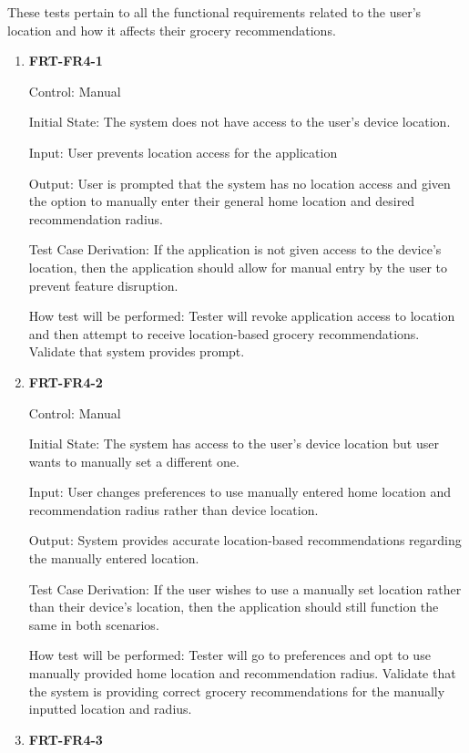 \documentclass[12pt, titlepage]{article}
\begin{document}
These tests pertain to all the functional requirements related to the user's location and how it affects their grocery recommendations.

\begin{enumerate}

\item{\textbf{FRT-FR4-1}}

Control: Manual
          
Initial State: The system does not have access to the user's device location.

Input: User prevents location access for the application
          
Output: User is prompted that the system has no location access and given the option to manually enter their general home location and desired recommendation radius.

Test Case Derivation: If the application is not given access to the device's location, then the application should allow for
manual entry by the user to prevent feature disruption.
          
How test will be performed: Tester will revoke application access to location  and then attempt to receive location-based grocery recommendations. Validate that system provides prompt.

\item{\textbf{FRT-FR4-2}}

Control: Manual
          
Initial State: The system has access to the user's device location but user wants to manually set a different one.

Input: User changes preferences to use manually entered home location and recommendation radius rather than device location.
          
Output: System provides accurate location-based recommendations regarding the manually entered location.

Test Case Derivation: If the user wishes to use a manually set location rather than their device's location, then the
application should still function the same in both scenarios.
          
How test will be performed: Tester will go to preferences and opt to use manually provided home location and recommendation radius. Validate that the system is providing correct grocery recommendations for the manually inputted location and radius.

\item{\textbf{FRT-FR4-3}}


\end{enumerate}
\end{document}
